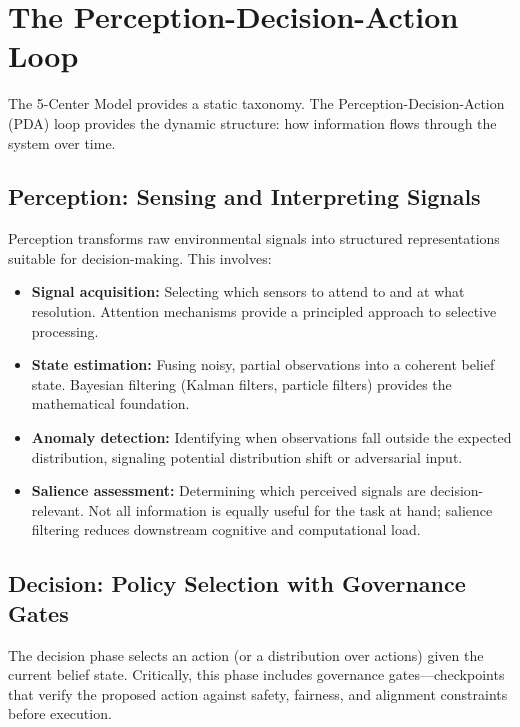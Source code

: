 \documentclass[11pt,a4paper]{article}
\begin{document}
\section{The Perception-Decision-Action Loop}
\label{sec:pda}

The 5-Center Model provides a static taxonomy. The Perception-Decision-Action (PDA) loop provides the dynamic structure: how information flows through the system over time.

\subsection{Perception: Sensing and Interpreting Signals}

Perception transforms raw environmental signals into structured representations suitable for decision-making. This involves:

\begin{itemize}[leftmargin=*, itemsep=2pt]
  \item \textbf{Signal acquisition:} Selecting which sensors to attend to and at what resolution. Attention mechanisms \citep{vaswani2017attention} provide a principled approach to selective processing.
  \item \textbf{State estimation:} Fusing noisy, partial observations into a coherent belief state. Bayesian filtering (Kalman filters, particle filters) provides the mathematical foundation.
  \item \textbf{Anomaly detection:} Identifying when observations fall outside the expected distribution, signaling potential distribution shift or adversarial input.
  \item \textbf{Salience assessment:} Determining which perceived signals are decision-relevant. Not all information is equally useful for the task at hand; salience filtering reduces downstream cognitive and computational load.
\end{itemize}

\subsection{Decision: Policy Selection with Governance Gates}

The decision phase selects an action (or a distribution over actions) given the current belief state. Critically, this phase includes governance gates---checkpoints that verify the proposed action against safety, fairness, and alignment constraints before execution.
\end{document}
